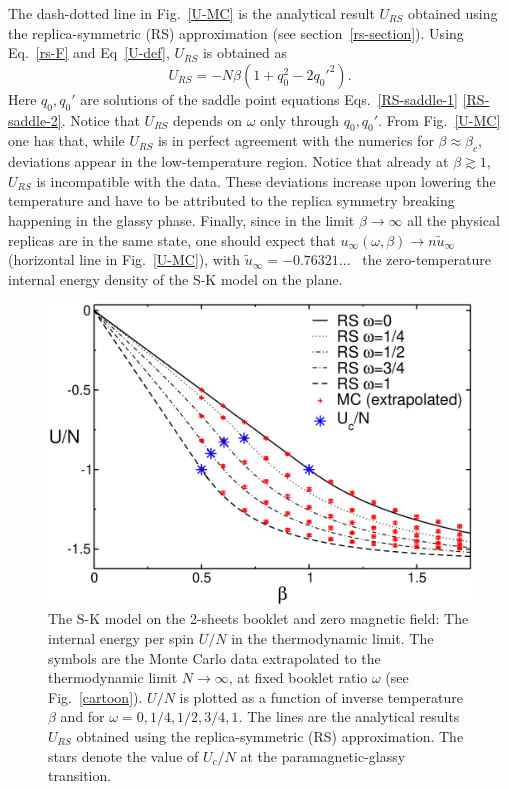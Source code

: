 \documentclass[twocolumn,superscriptaddress,prb,10pt]{revtex4-1}
\begin{document}
The dash-dotted line in Fig.~\ref{U-MC} is the analytical result $U_{RS}$ obtained using 
the replica-symmetric (RS) approximation (see section~\ref{rs-section}). 
Using Eq.~\eqref{rs-F} and Eq~\eqref{U-def}, $U_{RS}$  is obtained as   
%
\begin{equation}
U_{RS}=-N\beta(1+q_0^2-2q_0'^2). 
\label{U}
\end{equation}
% 
Here $q_0,q_0'$ are solutions of the saddle point equations Eqs.~\eqref{RS-saddle-1}
\eqref{RS-saddle-2}. Notice that $U_{RS}$ depends on $\omega$ only through $q_0,q_0'$. 
From Fig.~\ref{U-MC} one has that, while $U_{RS}$ is in perfect agreement with the 
numerics for $\beta\approx\beta_c$, deviations appear in the low-temperature region. 
Notice that already at $\beta\gtrsim 1$, $U_{RS}$ is incompatible with the data. 
These deviations increase upon lowering the temperature and  have  to be attributed 
to the replica symmetry breaking happening in the glassy phase. Finally, since in 
the limit $\beta\to\infty$ all the physical replicas are in the same state, 
one should expect that $u_\infty(\omega,\beta)\to n \tilde u_\infty$ (horizontal line in 
Fig.~\ref{U-MC}), with $\tilde u_{\infty}=-0.76321...$~\cite{parisi-1979,parisi-1983} the 
zero-temperature internal energy density of the S-K model on the plane. 


\begin{figure}[t]
\includegraphics*[width=0.93\linewidth]{./draft_figs/U_extrapolated}
\caption{
 The S-K model on the 2-sheets booklet and zero magnetic field: 
 The internal energy per spin $U/N$ in the thermodynamic limit. 
 The symbols are the Monte Carlo data extrapolated to the thermodynamic 
 limit $N\to\infty$, at fixed booklet ratio $\omega$ (see Fig.~\ref{cartoon}).  
 $U/N$ is plotted as a function of inverse temperature $\beta$ and for 
 $\omega=0,1/4,1/2,3/4,1$. The lines are the analytical results $U_{RS}$ 
 obtained using the replica-symmetric (RS) approximation. The stars denote 
 the value of $U_c/N$ at the paramagnetic-glassy transition. 
}
\label{U-RS}
\end{figure}
\end{document}
